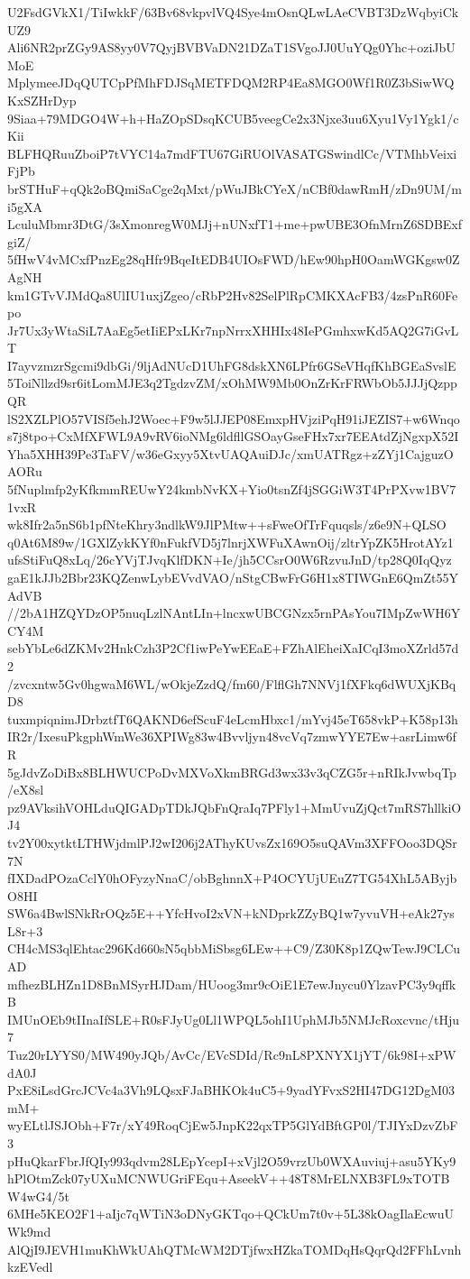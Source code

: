 U2FsdGVkX1/TiIwkkF/63Bv68vkpvlVQ4Sye4mOsnQLwLAeCVBT3DzWqbyiCkUZ9
Ali6NR2prZGy9AS8yy0V7QyjBVBVaDN21DZaT1SVgoJJ0UuYQg0Yhc+oziJbUMoE
MplymeeJDqQUTCpPfMhFDJSqMETFDQM2RP4Ea8MGO0Wf1R0Z3bSiwWQKxSZHrDyp
9Siaa+79MDGO4W+h+HaZOpSDsqKCUB5veegCe2x3Njxe3uu6Xyu1Vy1Ygk1/cKii
BLFHQRuuZboiP7tVYC14a7mdFTU67GiRUOlVASATGSwindlCc/VTMhbVeixiFjPb
brSTHuF+qQk2oBQmiSaCge2qMxt/pWuJBkCYeX/nCBf0dawRmH/zDn9UM/mi5gXA
LculuMbmr3DtG/3sXmonregW0MJj+nUNxfT1+me+pwUBE3OfnMrnZ6SDBExfgiZ/
5fHwV4vMCxfPnzEg28qHfr9BqeItEDB4UIOsFWD/hEw90hpH0OamWGKgsw0ZAgNH
km1GTvVJMdQa8UlIU1uxjZgeo/cRbP2Hv82SelPlRpCMKXAcFB3/4zsPnR60Fepo
Jr7Ux3yWtaSiL7AaEg5etIiEPxLKr7npNrrxXHHIx48IePGmhxwKd5AQ2G7iGvLT
I7ayvzmzrSgcmi9dbGi/9ljAdNUcD1UhFG8dskXN6LPfr6GSeVHqfKhBGEaSvslE
5ToiNllzd9sr6itLomMJE3q2TgdzvZM/xOhMW9Mb0OnZrKrFRWbOb5JJJjQzppQR
lS2XZLPlO57VISf5ehJ2Woec+F9w5lJJEP08EmxpHVjziPqH91iJEZIS7+w6Wnqo
s7j8tpo+CxMfXFWL9A9vRV6ioNMg6ldfllGSOayGseFHx7xr7EEAtdZjNgxpX52I
Yha5XHH39Pe3TaFV/w36eGxyy5XtvUAQAuiDJc/xmUATRgz+zZYj1CajguzOAORu
5fNuplmfp2yKfkmmREUwY24kmbNvKX+Yio0tsnZf4jSGGiW3T4PrPXvw1BV71vxR
wk8Ifr2a5nS6b1pfNteKhry3ndlkW9JlPMtw++sFweOfTrFquqsls/z6e9N+QLSO
q0At6M89w/1GXlZykKYf0nFukfVD5j7lnrjXWFuXAwnOij/zltrYpZK5HrotAYz1
ufsStiFuQ8xLq/26cYVjTJvqKlfDKN+Ie/jh5CCsrO0W6RzvuJnD/tp28Q0IqQyz
gaE1kJJb2Bbr23KQZenwLybEVvdVAO/nStgCBwFrG6H1x8TIWGnE6QmZt55YAdVB
//2bA1HZQYDzOP5nuqLzlNAntLIn+lncxwUBCGNzx5rnPAsYou7IMpZwWH6YCY4M
sebYbLe6dZKMv2HnkCzh3P2Cf1iwPeYwEEaE+FZhAlEheiXaICqI3moXZrld57d2
/zvcxntw5Gv0hgwaM6WL/wOkjeZzdQ/fm60/FlflGh7NNVj1fXFkq6dWUXjKBqD8
tuxmpiqnimJDrbztfT6QAKND6efScuF4eLcmHbxc1/mYvj45eT658vkP+K58p13h
IR2r/IxesuPkgphWmWe36XPIWg83w4Bvvljyn48vcVq7zmwYYE7Ew+asrLimw6fR
5gJdvZoDiBx8BLHWUCPoDvMXVoXkmBRGd3wx33v3qCZG5r+nRIkJvwbqTp/eX8sl
pz9AVksihVOHLduQIGADpTDkJQbFnQraIq7PFly1+MmUvuZjQct7mRS7hllkiOJ4
tv2Y00xytktLTHWjdmlPJ2wI206j2AThyKUvsZx169O5suQAVm3XFFOoo3DQSr7N
fIXDadPOzaCclY0hOFyzyNnaC/obBghnnX+P4OCYUjUEuZ7TG54XhL5AByjbO8HI
SW6a4BwlSNkRrOQz5E++YfcHvoI2xVN+kNDprkZZyBQ1w7yvuVH+eAk27ysL8r+3
CH4cMS3qlEhtac296Kd660sN5qbbMiSbsg6LEw++C9/Z30K8p1ZQwTewJ9CLCuAD
mfhezBLHZn1D8BnMSyrHJDam/HUoog3mr9cOiE1E7ewJnycu0YlzavPC3y9qffkB
IMUnOEb9tIInaIfSLE+R0sFJyUg0Ll1WPQL5ohI1UphMJb5NMJcRoxcvnc/tHju7
Tuz20rLYYS0/MW490yJQb/AvCc/EVcSDId/Rc9nL8PXNYX1jYT/6k98I+xPWdA0J
PxE8iLsdGrcJCVc4a3Vh9LQsxFJaBHKOk4uC5+9yadYFvxS2HI47DG12DgM03mM+
wyELtlJSJObh+F7r/xY49RoqCjEw5JnpK22qxTP5GlYdBftGP0l/TJIYxDzvZbF3
pHuQkarFbrJfQIy993qdvm28LEpYcepI+xVjl2O59vrzUb0WXAuviuj+asu5YKy9
hPlOtmZck07yUXuMCNWUGriFEqu+AseekV++48T8MrELNXB3FL9xTOTBW4wG4/5t
6MHe5KEO2F1+aIjc7qWTiN3oDNyGKTqo+QCkUm7t0v+5L38kOagIlaEcwuUWk9md
AlQjI9JEVH1muKhWkUAhQTMcWM2DTjfwxHZkaTOMDqHsQqrQd2FFhLvnhkzEVedl
